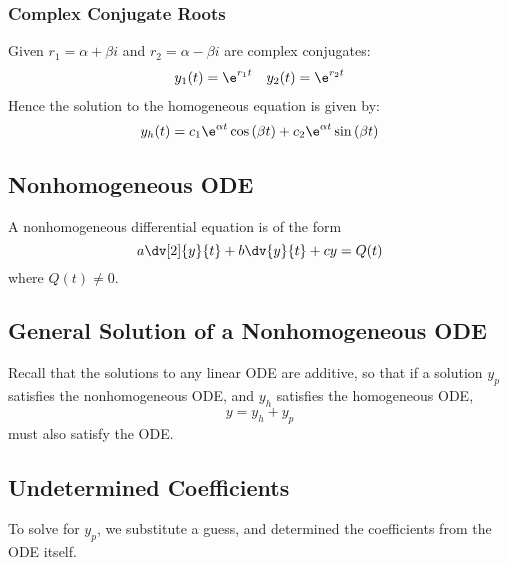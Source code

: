 \documentclass{article}
\begin{document}
\subsubsection{Complex Conjugate Roots}
Given $r_1 = \alpha + \beta i$ and $r_2 = \alpha - \beta i$ are complex conjugates:
\begin{align*}
    y_1(t) = \e^{r_1t} &  & y_2(t) = \e^{r_2t}
\end{align*}
Hence the solution to the homogeneous equation is given by:
\begin{equation*}
    y_h(t) = c_1\e^{\alpha t}\cos{\left( \beta t \right)} + c_2\e^{\alpha t}\sin{\left( \beta t \right)}
\end{equation*}
\subsection{Nonhomogeneous ODE}
A nonhomogeneous differential equation is of the form
\begin{equation*}
    a \dv[2]{y}{t} + b \dv{y}{t} + c y = Q(t)
\end{equation*}
where $Q(t)\neq 0$.
\subsection{General Solution of a Nonhomogeneous ODE}
Recall that the solutions to any linear ODE are additive, so that if a solution $y_p$ satisfies
the nonhomogeneous ODE, and $y_h$ satisfies the homogeneous ODE,
\begin{equation*}
    y = y_h + y_p
\end{equation*}
must also satisfy the ODE.
\subsection{Undetermined Coefficients}
To solve for $y_p$, we substitute a guess, and
determined the coefficients from the ODE itself.
\end{document}
